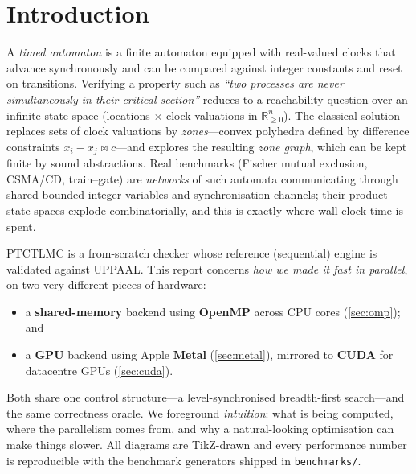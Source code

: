 \documentclass[11pt]{article}
\newcommand{\code}[1]{\texttt{\small #1}}
\begin{document}
\section{Introduction}
A \emph{timed automaton} is a finite automaton equipped with real-valued clocks that advance
synchronously and can be compared against integer constants and reset on transitions. Verifying
a property such as \emph{``two processes are never simultaneously in their critical
section''} reduces to a reachability question over an infinite state space (locations $\times$
clock valuations in $\mathbb{R}_{\geq 0}^{n}$). The classical solution replaces sets of clock
valuations by \emph{zones}---convex polyhedra defined by difference constraints
$x_i - x_j \bowtie c$---and explores the resulting \emph{zone graph}, which can be kept finite by
sound abstractions. Real benchmarks (Fischer mutual exclusion, CSMA/CD, train--gate) are
\emph{networks} of such automata communicating through shared bounded integer variables and
synchronisation channels; their product state spaces explode combinatorially, and this is exactly
where wall-clock time is spent.

\textsc{PTCTLMC} is a from-scratch checker whose reference (sequential) engine is validated against
UPPAAL. This report concerns \emph{how we made it fast in parallel}, on two very different pieces of
hardware:
\begin{itemize}\itemsep2pt
  \item a \textbf{shared-memory} backend using \textbf{OpenMP} across CPU cores
        (\cref{sec:omp}); and
  \item a \textbf{GPU} backend using Apple \textbf{Metal} (\cref{sec:metal}), mirrored to
        \textbf{CUDA} for datacentre GPUs (\cref{sec:cuda}).
\end{itemize}
Both share one control structure---a level-synchronised breadth-first search---and the same
correctness oracle. We foreground \emph{intuition}: what is being computed, where the parallelism
comes from, and why a natural-looking optimisation can make things slower. All diagrams are
TikZ-drawn and every performance number is reproducible with the benchmark generators shipped in
\code{benchmarks/}.

\end{document}
